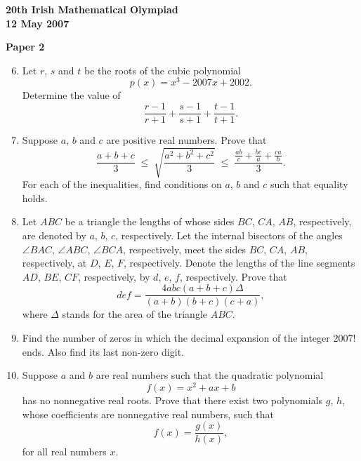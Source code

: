 \documentclass[12pt]{article}
\begin{document}
\newpage
\begin{center}
{\large\bfseries 20th Irish Mathematical Olympiad\\12 May 2007}
\end{center}
\bigskip\noindent\textbf{Paper 2}\bigskip
\begin{enumerate}
\setcounter{enumi}{5}
\item Let $r$, $s$ and $t$ be the roots of the cubic polynomial
\[
p(x) = x^3 - 2007x + 2002.
\]
Determine the value of
\[
\frac{r-1}{r+1} + \frac{s-1}{s+1} + \frac{t-1}{t+1}.
\]

\item Suppose $a$, $b$ and $c$ are positive real numbers. Prove that
\[
\frac{a+b+c}{3} \;\le\; \sqrt{\frac{a^2+b^2+c^2}{3}} \;\le\; \frac{\frac{ab}{c} + \frac{bc}{a} + \frac{ca}{b}}{3}.
\]
For each of the inequalities, find conditions on $a$, $b$ and $c$ such that equality holds.

\item Let $ABC$ be a triangle the lengths of whose sides $BC$, $CA$, $AB$, respectively, are denoted by $a$, $b$, $c$, respectively. Let the internal bisectors of the angles $\angle BAC$, $\angle ABC$, $\angle BCA$, respectively, meet the sides $BC$, $CA$, $AB$, respectively, at $D$, $E$, $F$, respectively. Denote the lengths of the line segments $AD$, $BE$, $CF$, respectively, by $d$, $e$, $f$, respectively. Prove that
\[
def = \frac{4abc(a+b+c)\Delta}{(a+b)(b+c)(c+a)},
\]
where $\Delta$ stands for the area of the triangle $ABC$.

\item Find the number of zeros in which the decimal expansion of the integer $2007!$ ends. Also find its last non-zero digit.

\item Suppose $a$ and $b$ are real numbers such that the quadratic polynomial
\[
f(x) = x^2 + ax + b
\]
has no nonnegative real roots. Prove that there exist two polynomials $g$, $h$, whose coefficients are nonnegative real numbers, such that
\[
f(x) = \frac{g(x)}{h(x)},
\]
for all real numbers $x$.
\end{enumerate}
\end{document}
